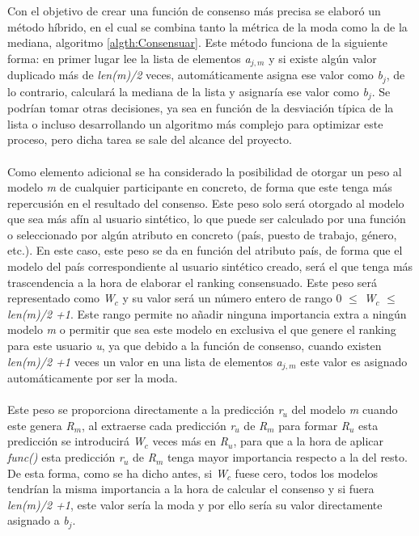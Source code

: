 Con el objetivo de crear una función de consenso más precisa se elaboró un método híbrido, en el cual se combina tanto la métrica de la moda como la de la mediana, algoritmo \ref{algth:Consensuar}. Este método funciona de la siguiente forma: en primer lugar lee la lista de elementos \textit{a$_{j, m}$} y si existe algún valor duplicado más de \textit{len(m)/2} veces, automáticamente asigna ese valor como \textit{b$_{j}$}, de lo contrario, calculará la mediana de la lista y asignaría ese valor como \textit{b$_{j}$}. Se podrían tomar otras decisiones, ya sea en función de la desviación típica de la lista o incluso desarrollando un algoritmo más complejo para optimizar este proceso, pero dicha tarea se sale del alcance del proyecto.
\\ \\
Como elemento adicional se ha considerado la posibilidad de otorgar un peso al modelo \textit{m} de cualquier participante en concreto, de forma que este tenga más repercusión en el resultado del consenso. Este peso solo será otorgado al modelo que sea más afín al usuario sintético, lo que puede ser calculado por una función o seleccionado por algún atributo en concreto (país, puesto de trabajo, género, etc.). En este caso, este peso se da en función del atributo país, de forma que el modelo del país correspondiente al usuario sintético creado, será el que tenga más trascendencia a la hora de elaborar el ranking consensuado. Este peso será representado como \textit{W$_{c}$} y su valor será un número entero de rango 0 $\leq$ \textit{W$_{c}$} $\leq$ \textit{len(m)/2 +1}. Este rango permite no añadir ninguna importancia extra a ningún modelo \textit{m} o permitir que sea este modelo en exclusiva el que genere el ranking para este usuario \textit{u}, ya que debido a la función de consenso, cuando existen \textit{len(m)/2 +1} veces un valor en una lista de elementos \textit{a$_{j, m}$} este valor es asignado automáticamente por ser la moda.
\\ \\
Este peso se proporciona directamente a la predicción \textit{r$_{u}$} del modelo \textit{m} cuando este genera \textit{R$_{m}$}, al extraerse cada predicción \textit{r$_{u}$} de \textit{R$_{m}$} para formar \textit{R$_{u}$} esta predicción se introducirá \textit{W$_{c}$} veces más en \textit{R$_{u}$}, para que a la hora de aplicar \textit{func()} esta predicción \textit{r$_{u}$} de \textit{R$_{m}$} tenga mayor importancia respecto a la del resto. De esta forma, como se ha dicho antes, si \textit{W$_{c}$} fuese cero, todos los modelos tendrían la misma importancia a la hora de calcular el consenso y si fuera \textit{len(m)/2 +1}, este valor sería la moda y por ello sería su valor directamente asignado a \textit{b$_{j}$}.

